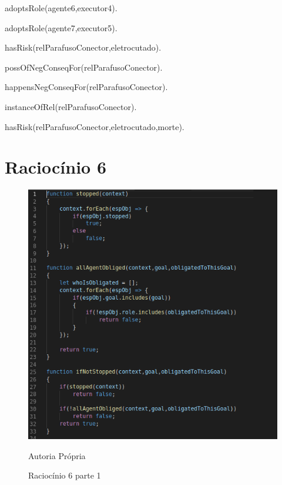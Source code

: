 adoptsRole(agente6,executor4).

adoptsRole(agente7,executor5).

hasRisk(relParafusoConector,eletrocutado).

possOfNegConseqFor(relParafusoConector).

happensNegConseqFor(relParafusoConector).

instanceOfRel(relParafusoConector).

hasRisk(relParafusoConector,eletrocutado,morte).

\section{Raciocínio 6}


\begin{figure}[H]
  \centering
  \caption{Raciocínio 6 parte 1}
  \includegraphics[width=0.8\linewidth]{figure/algjs} 
  \begin{center}
  	Autoria Própria
  \end{center}
  \label{atividiagram2}
\end{figure}



